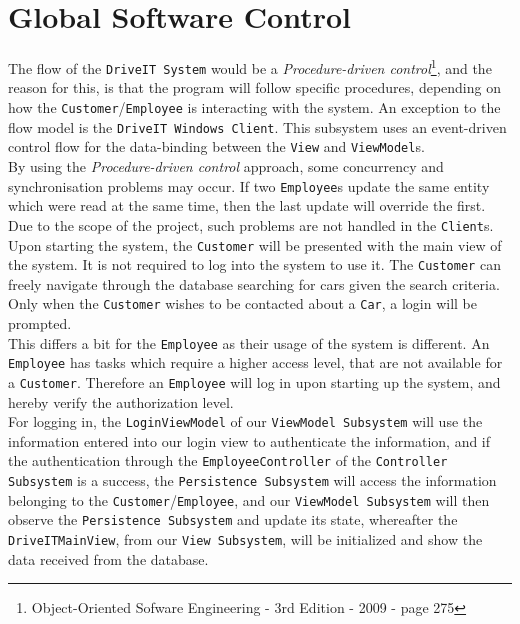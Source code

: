 \section{Global Software Control}

The flow of the \texttt{DriveIT System} would be a \textit{Procedure-driven control}\footnote{{Object-Oriented Sofware Engineering - 3rd Edition - 2009 - page 275}}, and the reason for this, is that the program will follow specific procedures, depending on how the \texttt{Customer}/\texttt{Employee} is interacting with the system. An exception to the flow model is the \texttt{DriveIT Windows Client}. This subsystem uses an event-driven control flow for the data-binding between the \texttt{View} and \texttt{ViewModel}s.\\

By using the \textit{Procedure-driven control} approach, some concurrency and synchronisation problems may occur. If two \texttt{Employee}s update the same entity which were read at the same time, then the last update will override the first. Due to the scope of the project, such problems are not handled in the \texttt{Client}s.\\

Upon starting the system, the \texttt{Customer} will be presented with the main view of the system. It is not required to log into the system to use it. The \texttt{Customer} can freely navigate through the database searching for cars given the search criteria. Only when the \texttt{Customer} wishes to be contacted about a \texttt{Car}, a login will be prompted.\\ 

This differs a bit for the \texttt{Employee} as their usage of the system is different. An \texttt{Employee} has tasks which require a higher access level, that are not available for a \texttt{Customer}. Therefore an \texttt{Employee} will log in upon starting up the system, and hereby verify the authorization level.\\

For logging in, the \texttt{LoginViewModel} of our \texttt{ViewModel Subsystem} will use the information entered into our login view to authenticate the information, and if the authentication through the \texttt{EmployeeController} of the \texttt{Controller Subsystem} is a success, the \texttt{Persistence Subsystem} will access the information belonging to the \texttt{Customer}/\texttt{Employee}, and our \texttt{ViewModel Subsystem} will then observe the \texttt{Persistence Subsystem} and update its state, whereafter the \texttt{DriveITMainView}, from our \texttt{View Subsystem}, will be initialized and show the data received from the database.\\


